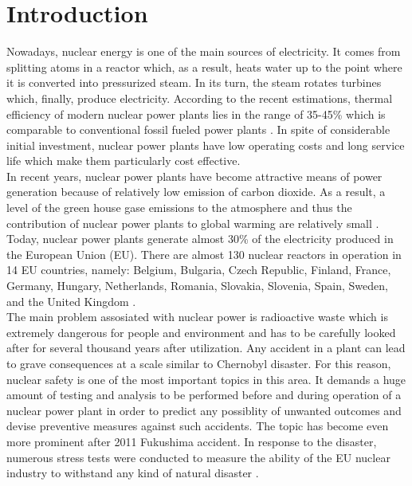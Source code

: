 \chapter{Introduction}\label{chapter:introduction}

Nowadays, nuclear energy is one of the main sources of electricity. It comes from splitting atoms in a reactor which, as a result, heats water up to the point where it is converted into pressurized steam. In its turn, the steam rotates turbines which, finally, produce electricity. According to the recent estimations, thermal efficiency of modern nuclear power plants lies in the range of 35-45\% which is comparable to conventional fossil fueled power plants \cite{intro:efficiency-of-nuclear-power-plants}. In spite of considerable initial investment,  nuclear power plants have low operating costs and long service life which make them particularly cost effective.\\


In recent years, nuclear power plants have become attractive means of power generation because of relatively low emission of carbon dioxide. As a result, a level of the green house gase emissions to the atmosphere and thus the contribution of nuclear power plants to global warming are relatively small \cite{intro:pros-and-cons-of-nuclear-power}.\\


Today, nuclear power plants generate almost 30\% of the electricity produced in the European Union (EU). There are almost 130 nuclear reactors in operation in 14 EU countries, namely: Belgium, Bulgaria, Czech Republic, Finland, France, Germany, Hungary, Netherlands, Romania, Slovakia, Slovenia, Spain, Sweden, and the United Kingdom \cite{intro:eu-nuclear-industry-general}.\\


The main problem assosiated with nuclear power is radioactive waste which is extremely dangerous for people and environment and has to be carefully looked after for several thousand years after utilization. Any accident in a plant can lead to grave consequences at a scale similar to Chernobyl disaster. For this reason, nuclear safety is one of the most important topics in this area. It demands a huge amount of testing and analysis to be performed before and during operation of a nuclear power plant in order to predict any possiblity of unwanted outcomes and devise preventive measures against such accidents. The topic has become even more prominent after 2011 Fukushima accident. In response to the disaster, numerous stress tests were conducted to measure the ability of the EU nuclear industry to withstand any kind of natural disaster \cite{intro:eu-nuclear-industry-general}.\\



